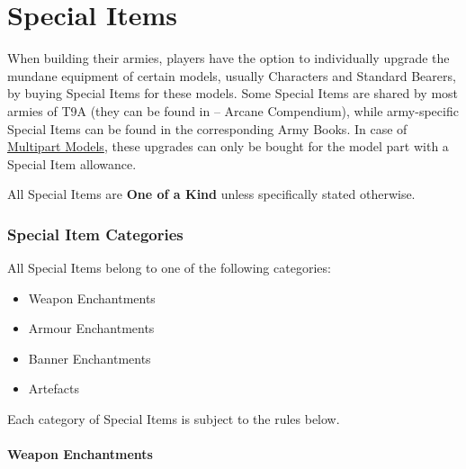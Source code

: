 \part{Special Items}
\label{special_items}

When building their armies, players have the option to individually upgrade the mundane equipment of certain models, usually Characters and Standard Bearers, by buying Special Items for these models. Some Special Items are shared by most armies of T9A (they can be found in \nameofthegame{} -- Arcane Compendium), while army-specific Special Items can be found in the corresponding Army Books. In case of \hyperref[multipart_models]{Multipart Models}, these upgrades can only be bought for the model part with a Special Item allowance.

All Special Items are \textbf{One of a Kind} unless specifically stated otherwise.

\RBbmc

\section{Special Item Categories}

All Special Items belong to one of the following categories:

\begin{itemize}
	\item Weapon Enchantments
	\item Armour Enchantments
	\item Banner Enchantments
	\item Artefacts
\end{itemize}

Each category of Special Items is subject to the rules below.

\subsection{Weapon Enchantments}
\label{weapon_enchantments}

